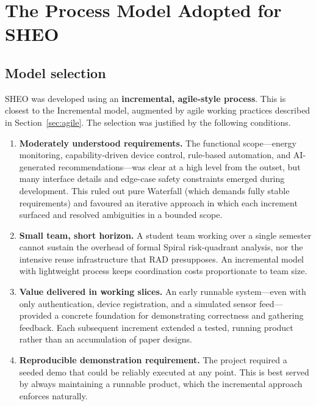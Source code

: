 \section{The Process Model Adopted for SHEO}
\label{sec:adopted}

\subsection{Model selection}

SHEO was developed using an \textbf{incremental, agile-style process}. This is closest
to the Incremental model, augmented by agile working practices described in
Section~\ref{sec:agile}. The selection was justified by the following conditions.

\begin{enumerate}[leftmargin=*, label=(\arabic*)]
  \item \textbf{Moderately understood requirements.} The functional scope---energy
        monitoring, capability-driven device control, rule-based automation, and
        AI-generated recommendations---was clear at a high level from the outset, but many
        interface details and edge-case safety constraints emerged during development. This
        ruled out pure Waterfall (which demands fully stable requirements) and favoured an
        iterative approach in which each increment surfaced and resolved ambiguities in a
        bounded scope.

  \item \textbf{Small team, short horizon.} A student team working over a single semester
        cannot sustain the overhead of formal Spiral risk-quadrant analysis, nor the
        intensive reuse infrastructure that RAD presupposes. An incremental model with
        lightweight process keeps coordination costs proportionate to team size.

  \item \textbf{Value delivered in working slices.} An early runnable system---even with
        only authentication, device registration, and a simulated sensor feed---provided a
        concrete foundation for demonstrating correctness and gathering feedback. Each
        subsequent increment extended a tested, running product rather than an accumulation
        of paper designs.

  \item \textbf{Reproducible demonstration requirement.} The project required a seeded demo
        that could be reliably executed at any point. This is best served by always
        maintaining a runnable product, which the incremental approach enforces naturally.
\end{enumerate}

